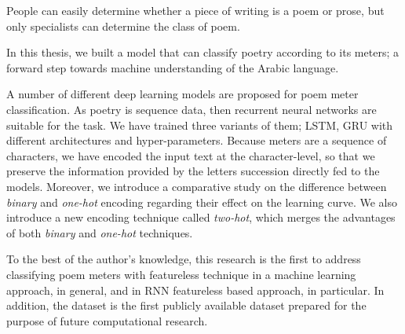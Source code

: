 
\begin{spacing}{1}\end{spacing}

People can easily determine whether a piece of writing is a poem or prose, but only specialists can determine the class of poem.

In this thesis, we built a model that can classify poetry according to its meters; a forward step towards machine understanding of the Arabic language.

A number of different deep learning models are proposed for poem meter classification. As poetry is sequence data, then recurrent neural networks are suitable for the task. We have trained three variants of them; LSTM, GRU with different architectures and hyper-parameters. Because meters are a sequence of characters, we have encoded the input text at the character-level, so that we preserve the information provided by the letters succession directly fed to the models. Moreover, we introduce a comparative study on the difference between \textit{binary} and \textit{one-hot} encoding regarding their effect on the learning curve. We also introduce a new encoding technique called \textit{two-hot}, which merges the advantages of both \textit{binary} and \textit{one-hot} techniques.

To the best of the author’s knowledge, this research is the first to address classifying poem meters with featureless technique in a machine learning approach, in general, and in RNN featureless based approach, in particular. In addition, the dataset is the first publicly available dataset prepared for the purpose of future computational research.



